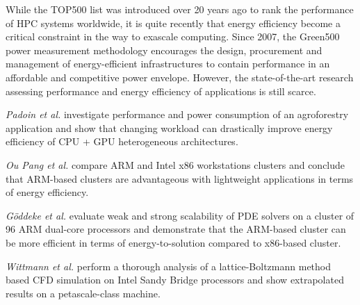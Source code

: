 While the  TOP500 list was  introduced over 20  years ago to  rank the
performance of HPC systems  worldwide, it is quite recently that energy
efficiency  become  a  critical  constraint  in the  way  to  exascale
computing.   Since 2007,  the Green500  power  measurement methodology
encourages the design,  procurement and management of energy-efficient
infrastructures to contain performance in an affordable and competitive
power  envelope.   However,  the state-of-the-art  research  assessing
performance  and energy  efficiency  of applications  is still scarce.

\emph{Padoin et al.}   \cite{Padoin-2013} investigate performance and
power  consumption  of  an  agroforestry  application  and  show  that
changing workload  can drastically improve energy efficiency  of CPU +
GPU heterogeneous architectures.

\emph{Ou  Pang et  al.}   \cite{Ou-2012} compare  ARM  and Intel  x86
workstations  clusters  and   conclude  that  ARM-based  clusters  are
advantageous  with   lightweight  applications  in   terms  of  energy
efficiency.

\emph{G\"oddeke et al.}  \cite{Goddeke-2013} evaluate weak and strong
scalability of PDE solvers on a cluster of 96 ARM dual-core processors
and demonstrate  that the ARM-based  cluster can be more  efficient in
terms of energy-to-solution compared to x86-based cluster.

\emph{Wittmann  et  al.}   \cite{Wittmann-2013}  perform  a  thorough
analysis of  a lattice-Boltzmann method based CFD  simulation on Intel
Sandy Bridge  processors   and  show   extrapolated  results   on  a
petascale-class machine.

